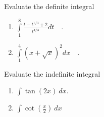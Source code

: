 \documentclass{article}
\begin{document}
\begin{problem}
Evaluate the definite integral 
\begin{enumerate}
\item $\displaystyle\int\limits_{1}^{8} \frac{t-t^{1/3}+2}{t^{4/3}} dt\quad .$
\item $\displaystyle\int\limits_{1}^{4} (x+\sqrt{x})^2 dx\quad .$
\end{enumerate}
\end{problem}

\begin{problem}
Evaluate the indefinite integral 
\begin{enumerate}
\item $\displaystyle\int \tan (2x) ~dx$.
\item $\displaystyle \int \cot \left(\frac{x}{2}\right)~dx$
\end{enumerate}
\end{problem}
\end{document}
